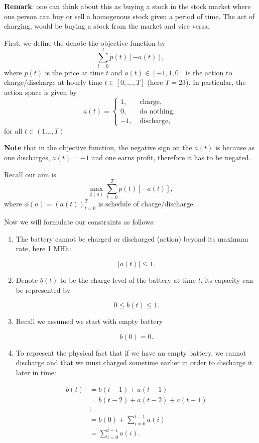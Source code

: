 \documentclass[11pt]{article}
\begin{document}
\textbf{Remark}: one can think about this as buying a stock in the stock
market where one person can buy or sell a homogenous stock given a
period of time. The act of charging, would be buying a stock from the
market and vice versa.

First, we define the denote the objective function by \[
    \sum_{t=0}^T p(t) [- a(t)],
    \] where \(p(t)\) is the price at time \(t\) and
\(a(t) \in [-1, 1, 0]\) is the action to charge/discharge at hourly time
\(t \in [0,\dots,T]\) (here \(T=23\)). In particular, the action space
is given by \[
a(t) =
\begin{cases}
1,\quad & \text{charge},\\
0, & \text{do nothing},\\
-1, & \text{discharge},
\end{cases}
\] for all \(t \in (1\dots,T)\)

\textbf{Note} that in the objective function, the negative sign on the
\(a(t)\) is because as one discharges, \(a(t) = -1\) and one earns
profit, therefore it has to be negated.

Recall our aim is \[
    \max_{\phi(a)} \sum_{t=0}^T p(t) [- a(t)],
    \] where \(\phi(a) = (a(t))_{t=0}^T\) is schedule of
charge/discharge.

Now we will formulate our constraints as follows:

\begin{enumerate}
\def\labelenumi{\arabic{enumi}.}
\item
  The battery cannot be charged or discharged (action) beyond its
  maximum rate, here 1 MHh:

  \[
  |a(t)| \leq 1.
  \]
\item
  Denote \(b(t)\) to be the charge level of the battery at time \(t\),
  its capacity can be represented by

  \[
  0 \leq b(t) \leq 1.
  \]
\item
  Recall we assumed we start with empty battery

  \[
   b(0) = 0.
   \]
\item
  To represent the physical fact that if we have an empty battery, we
  cannot discharge and that we must charged sometime earlier in order to
  discharge it later in time:

  \[
   \begin{aligned}
   b(t) & = b(t-1) + a(t-1)
   \\
   & = b(t-2) + a(t-2) + a(t-1)
   \\
   & \vdots
   \\
   & = b(0) + \sum_{i=0}^{t-1} a(i)
   \\
   & = \sum_{i=0}^{t-1} a(i).
   \end{aligned}
   \]
\end{enumerate}
\end{document}
